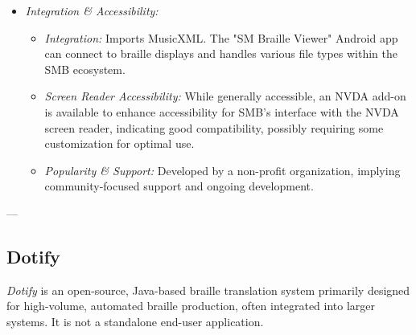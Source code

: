 \begin{itemize}
    \item \emph{Integration \& Accessibility:}
    \begin{itemize}
        \item \emph{Integration:} Imports MusicXML. The "SM Braille Viewer" Android app can connect to braille displays and handles various file types within the SMB ecosystem.
        \item \emph{Screen Reader Accessibility:} While generally accessible, an NVDA add-on is available to enhance accessibility for SMB's interface with the NVDA screen reader, indicating good compatibility, possibly requiring some customization for optimal use\footnotemark{}.
        \item \emph{Popularity \& Support:} Developed by a non-profit organization, implying community-focused support and ongoing development.
    \end{itemize}
\end{itemize}

---

\subsection{Dotify}
\emph{Dotify} is an open-source, Java-based braille translation system primarily designed for high-volume, automated braille production, often integrated into larger systems. It is not a standalone end-user application.


